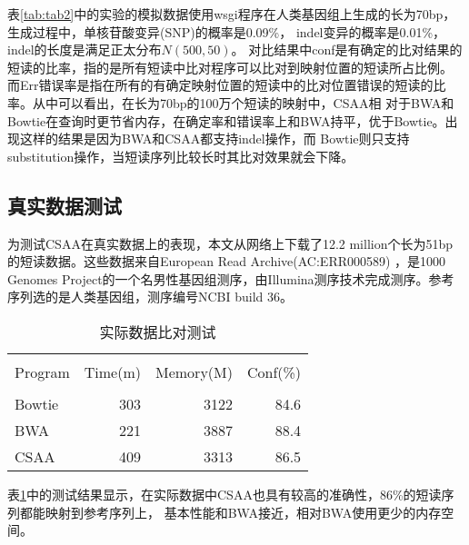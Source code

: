 表\ref{tab:tab2}中的实验的模拟数据使用wsgi程序在人类基因组上生成的长为70bp，生成过程中，单核苷酸变异(SNP)的概率是0.09\%，
indel变异的概率是0.01\%，indel的长度是满足正太分布$N(500,50)$。
对比结果中conf是有确定的比对结果的短读的比率，指的是所有短读中比对程序可以比对到映射位置的短读所占比例。
而Err错误率是指在所有的有确定映射位置的短读中的比对位置错误的短读的比率。从中可以看出，在长为70bp的100万个短读的映射中，CSAA相
对于BWA和Bowtie在查询时更节省内存，在确定率和错误率上和BWA持平，优于Bowtie。出现这样的结果是因为BWA和CSAA都支持indel操作，而
Bowtie则只支持substitution操作，当短读序列比较长时其比对效果就会下降。

\subsection{真实数据测试}
为测试CSAA在真实数据上的表现，本文从网络上下载了12.2 million个长为51bp的短读数据。这些数据来自European Read Archive(AC:ERR000589)
，是1000 Genomes Project的一个名男性基因组测序，由Illumina测序技术完成测序。参考序列选的是人类基因组，测序编号NCBI build 36。

\begin{table}[htbp]
    \caption{实际数据比对测试}
    \label{tab:tab3}
    \centering
    \begin{tabular}{lrrr}
       \hline \\
       Program&Time(m)&Memory(M)&Conf(\%)\\
       \hline \\
       Bowtie&303&3122&84.6\\
       BWA&221&3887&88.4\\
       CSAA&409&3313&86.5\\
       \hline
    \end{tabular}
\end{table}

表\ref{tab:tab3}中的测试结果显示，在实际数据中CSAA也具有较高的准确性，86\%的短读序列都能映射到参考序列上，
基本性能和BWA接近，相对BWA使用更少的内存空间。




